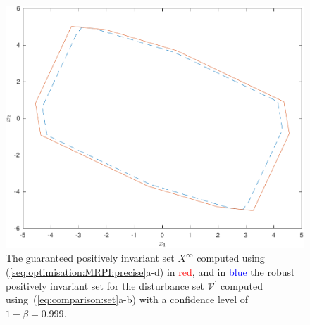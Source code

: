 \documentclass{ifacconf}
\providecommand{\V}{\mathcal V}
\begin{document}
\begin{figure}[ht]
\includegraphics[width=.99\linewidth]{MRPIsetOptimised.pdf}
\caption{The guaranteed positively invariant set $X^\infty$ computed using
\mbox{(\ref{seq:optimisation:MRPI:precise}a-d)}
in \textcolor{red}{red}, and in \textcolor{blue}{blue} the robust positively invariant set for the disturbance set $\V^\prime$ computed using~(\ref{eq:comparison:set}a-b)
with a confidence level of $1-\beta = 0.999$.}
\label{fig:MRPI:optimised}
\vspace{2mm}\end{figure}
\end{document}
